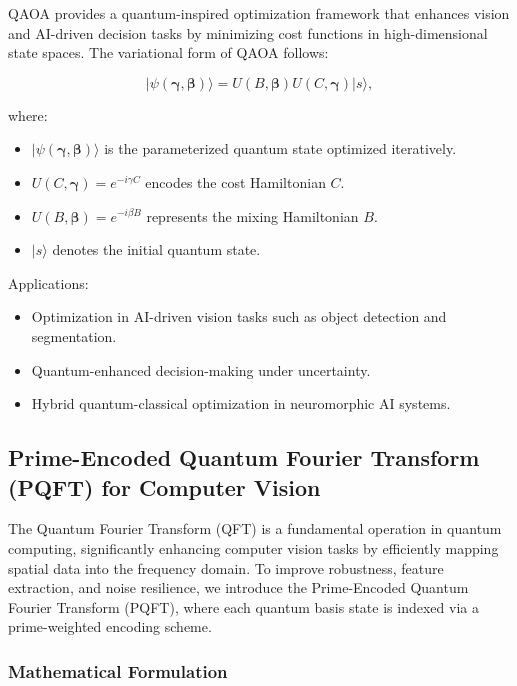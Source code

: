 \documentclass{article}
\theoremstyle{plain}
\begin{document}
QAOA provides a quantum-inspired optimization framework that enhances vision and AI-driven decision tasks by minimizing cost functions in high-dimensional state spaces. The variational form of QAOA follows:

\begin{equation}
|\psi(\boldsymbol{\gamma}, \boldsymbol{\beta})\rangle = U(B, \boldsymbol{\beta}) U(C, \boldsymbol{\gamma}) |s\rangle,
\end{equation}

where:
\begin{itemize}
    \item $|\psi(\boldsymbol{\gamma}, \boldsymbol{\beta})\rangle$ is the parameterized quantum state optimized iteratively.
    \item $U(C, \boldsymbol{\gamma}) = e^{-i \gamma C}$ encodes the cost Hamiltonian $C$.
    \item $U(B, \boldsymbol{\beta}) = e^{-i \beta B}$ represents the mixing Hamiltonian $B$.
    \item $|s\rangle$ denotes the initial quantum state.
\end{itemize}

Applications:
\begin{itemize}
    \item Optimization in AI-driven vision tasks such as object detection and segmentation.
    \item Quantum-enhanced decision-making under uncertainty.
    \item Hybrid quantum-classical optimization in neuromorphic AI systems.
\end{itemize}

\subsection{Prime-Encoded Quantum Fourier Transform (PQFT) for Computer Vision}

The Quantum Fourier Transform (QFT) is a fundamental operation in quantum computing, significantly enhancing computer vision tasks by efficiently mapping spatial data into the frequency domain. To improve robustness, feature extraction, and noise resilience, we introduce the Prime-Encoded Quantum Fourier Transform (PQFT), where each quantum basis state is indexed via a prime-weighted encoding scheme.

\subsubsection{Mathematical Formulation}
\end{document}
